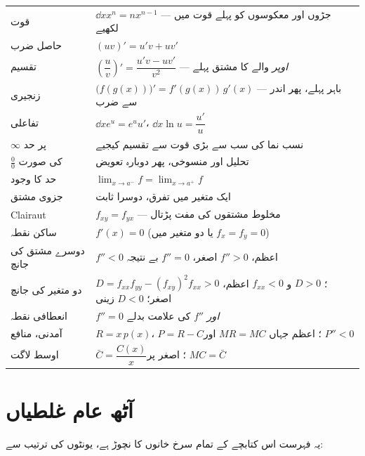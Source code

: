 \begin{center}
\begin{tabular}{@{}p{4.6cm} p{9.8cm}@{}}
\toprule
قوت & \(\dd{}{x}x^{n}=nx^{n-1}\) --- جڑوں اور معکوسوں کو پہلے قوت میں لکھیے \\
حاصل ضرب & \((uv)'=u'v+uv'\) \\
تقسیم & \(\left(\dfrac uv\right)'=\dfrac{u'v-uv'}{v^{2}}\) --- \emph{اوپر} والے کا مشتق پہلے \\
زنجیری & \(\bigl(f(g(x))\bigr)'=f'(g(x))\,g'(x)\) --- باہر پہلے، پھر اندر سے ضرب \\
تفاعلی & \(\dd{}{x}e^{u}=e^{u}u'\)، \quad \(\dd{}{x}\ln u=\dfrac{u'}{u}\) \\
\(\infty\) پر حد & نسب نما کی سب سے بڑی قوت سے تقسیم کیجیے \\
\(\tfrac00\) کی صورت & تحلیل اور منسوخی، پھر دوبارہ تعویض \\
حد کا وجود & \(\lim_{x\to a^{-}}f=\lim_{x\to a^{+}}f\) \\
جزوی مشتق & ایک متغیر میں تفرق، دوسرا ثابت \\
\textenglish{Clairaut} & \(f_{xy}=f_{yx}\) --- مخلوط مشتقوں کی مفت پڑتال \\
ساکن نقطہ & \(f'(x)=0\) (یا دو متغیر میں \(f_x=f_y=0\)) \\
دوسرے مشتق کی جانچ & \(f''<0\) اعظم، \(f''>0\) اصغر، \(f''=0\) بے نتیجہ \\
دو متغیر کی جانچ & \(D=f_{xx}f_{yy}-(f_{xy})^{2}\)؛ \(D>0\) و \(f_{xx}<0\) اعظم، \(f_{xx}>0\) اصغر؛ \(D<0\) زینی \\
انعطافی نقطہ & \(f''=0\) \emph{اور} \(f''\) کی علامت بدلے \\
آمدنی، منافع & \(R=x\,p(x)\)، \quad \(P=R-C\)؛ اعظم جہاں \(MR=MC\) اور \(P''<0\) \\
اوسط لاگت & \(\bar{C}=\dfrac{C(x)}{x}\)؛ اصغر پر \(MC=\bar{C}\) \\
\bottomrule
\end{tabular}
\end{center}

\clearpage

\section*{آٹھ عام غلطیاں}

یہ فہرست اس کتابچے کے تمام سرخ خانوں کا نچوڑ ہے، یونٹوں کی ترتیب سے:

